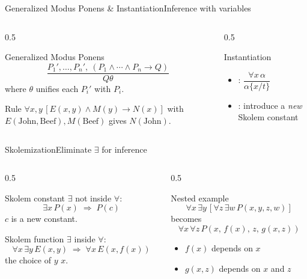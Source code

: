 \documentclass[aspectratio=169,11pt]{beamer}
\begin{document}
\begin{frame}{Generalized Modus Ponens \& Instantiation}{Inference with variables}
  \begin{columns}[T]
    \begin{column}{0.5\textwidth}
      \begin{block}{Generalized Modus Ponens}
        \small
        \[ \frac{P_1',\dots,P_n',\ (P_1\land\cdots\land P_n \rightarrow Q)}{Q\theta} \]
        where $\theta$ unifies each $P_i'$ with $P_i$.
      \end{block}
      \scriptsize
      Rule $\forall x,y\,[E(x,y)\land M(y)\rightarrow N(x)]$ with
      $E(\text{John},\text{Beef}),M(\text{Beef})$ gives $N(\text{John})$.
    \end{column}
    \begin{column}{0.5\textwidth}
      \begin{exampleblock}{Instantiation}
        \small
        \begin{itemize}
          \item {}: $\dfrac{\forall x\,\alpha}{\alpha\{x/t\}}$
          \item {}: introduce a \emph{new} Skolem constant
        \end{itemize}
      \end{exampleblock}
    \end{column}
  \end{columns}
\end{frame}

\begin{frame}{Skolemization}{Eliminate $\exists$ for inference}
  \begin{columns}[c]
    \begin{column}{0.5\textwidth}
      \begin{block}{Skolem constant}
        \small $\exists$ not inside $\forall$:
        \[ \exists x\,P(x) \;\Rightarrow\; P(c) \]
        $c$ is a new constant.
      \end{block}
      \begin{exampleblock}{Skolem function}
        \small $\exists$ inside $\forall$:
        \[ \forall x\,\exists y\,E(x,y) \;\Rightarrow\; \forall x\,E(x,f(x)) \]
        the choice of $y$  $x$.
      \end{exampleblock}
    \end{column}
    \begin{column}{0.5\textwidth}
      \begin{block}{Nested example}
        \scriptsize
        \[ \forall x\,\exists y\,[\forall z\,\exists w\,P(x,y,z,w)] \]
        becomes
        \[ \forall x\,\forall z\,P(x,\,f(x),\,z,\,g(x,z)) \]
        \begin{itemize}
          \item $f(x)$ depends on $x$
          \item $g(x,z)$ depends on $x$ and $z$
        \end{itemize}
      \end{block}
    \end{column}
  \end{columns}
\end{frame}
\end{document}

